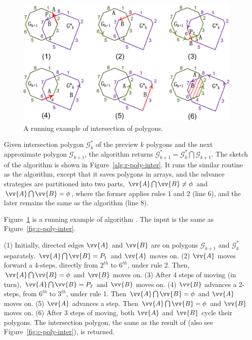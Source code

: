 \begin{figure}[tb!]
\centering
\includegraphics[scale=0.88]{figures/Fig-r-poly-inter.png}
\vspace{-1ex}
\caption{\small A running example of intersection of polygons.}
\label{fig:r-poly-inter}
\end{figure}




Given intersection polygon $\mathcal{G}^*_k$ of the preview $k$ polygons and the next approximate polygon $\mathcal{G}_{k+1}$, the algorithm \rpia returns $\mathcal{G}^*_{k+1} = \mathcal{G}^*_k  \bigcap \mathcal{G}_{k+1}$.
The sketch of the algorithm is shown in Figure~\ref{alg:r-poly-inter}.
%
It runs the similar routine as the \cpia algorithm, except that it saves polygons in arrays, and the advance strategies are partitioned into two parts, \ie $\vv{A} \bigcap \vv{B} \ne \phi$ and $\vv{A} \bigcap \vv{B} = \phi$, where the former applies rules 1 and 2 (line 6), and the later remains the same as the \cpia algorithm (line 8).







\begin{example}
Figure~\ref{fig:r-poly-inter} is a running example of algorithm \rpia. The input is the same as Figure~\ref{fig:c-poly-inter}.

\ni (1) Initially, directed edges $\vv{A}$ and $\vv{B}$ are on polygons $\mathcal{G}_{k+1}$ and $\mathcal{G}^*_{k}$ separately. $\vv{A} \bigcap \vv{B} = P_1$ and $\vv{A}$ moves on.
\ni (2) $\vv{A}$ moves forward a 4-steps, directly from $2^{th}$ to $6^{th}$, under rule 2. Then, $\vv{A} \bigcap \vv{B} = \phi$ and $\vv{B}$ moves on.
\ni (3) After 4 steps of moving (in turn), $\vv{A} \bigcap \vv{B} = P_2$ and $\vv{B}$ moves on.
\ni (4) $\vv{B}$ advances a 2-steps, from $6^{th}$ to $3^{th}$, under rule 1. Then $\vv{A} \bigcap \vv{B} = \phi$ and $\vv{A}$ moves on.
\ni (5) $\vv{A}$ advances a step. Then $\vv{A} \bigcap \vv{B} = \phi$ and $\vv{B}$ moves on.
\ni (6) After 3 steps of moving, both $\vv{A}$ and $\vv{B}$ cycle their polygons. The intersection polygon, the same as the result of \cpia (also see Figure~\ref{fig:c-poly-inter}), is returned.
\end{example}





